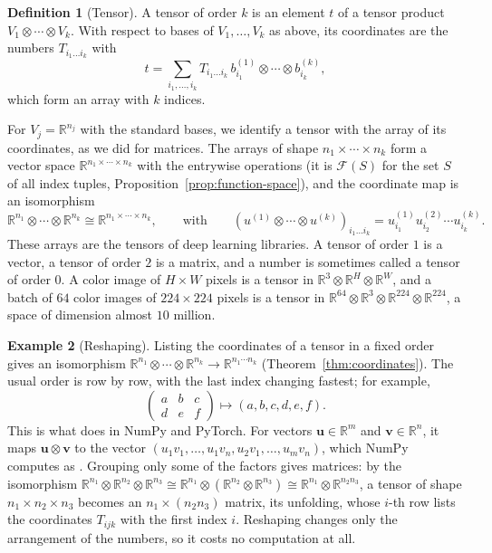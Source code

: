 \documentclass[11pt]{article}
\newcommand{\py}[1]{\texttt{\detokenize{#1}}}
\theoremstyle{definition}
\newtheorem{definition}{Definition}[section]
\newtheorem{example}[definition]{Example}
\theoremstyle{plain}
\theoremstyle{remark}
\begin{document}
\begin{definition}[Tensor]\label{def:tensor}
    A tensor of order $k$ is an element $t$ of a tensor product $V_1 \otimes \cdots \otimes V_k$. With respect to bases of $V_1, \ldots, V_k$ as above, its coordinates are the numbers $T_{i_1 \ldots i_k}$ with
    \[t = \sum_{i_1, \ldots, i_k} T_{i_1 \ldots i_k}\, b^{(1)}_{i_1} \otimes \cdots \otimes b^{(k)}_{i_k},\]
    which form an array with $k$ indices.
\end{definition}

For $V_j = \mathbb{R}^{n_j}$ with the standard bases, we identify a tensor with the array of its coordinates, as we did for matrices. The arrays of shape $n_1 \times \cdots \times n_k$ form a vector space $\mathbb{R}^{n_1 \times \cdots \times n_k}$ with the entrywise operations (it is $\mathcal{F}(S)$ for the set $S$ of all index tuples, Proposition~\ref{prop:function-space}), and the coordinate map is an isomorphism
\[\mathbb{R}^{n_1} \otimes \cdots \otimes \mathbb{R}^{n_k} \cong \mathbb{R}^{n_1 \times \cdots \times n_k}, \qquad \text{with} \qquad (u^{(1)} \otimes \cdots \otimes u^{(k)})_{i_1 \ldots i_k} = u^{(1)}_{i_1} u^{(2)}_{i_2} \cdots u^{(k)}_{i_k}.\]
These arrays are the tensors of deep learning libraries. A tensor of order $1$ is a vector, a tensor of order $2$ is a matrix, and a number is sometimes called a tensor of order $0$. A color image of $H \times W$ pixels is a tensor in $\mathbb{R}^3 \otimes \mathbb{R}^H \otimes \mathbb{R}^W$, and a batch of $64$ color images of $224 \times 224$ pixels is a tensor in $\mathbb{R}^{64} \otimes \mathbb{R}^3 \otimes \mathbb{R}^{224} \otimes \mathbb{R}^{224}$, a space of dimension almost $10$ million.

\begin{example}[Reshaping]\label{ex:reshape}
    Listing the coordinates of a tensor in a fixed order gives an isomorphism $\mathbb{R}^{n_1} \otimes \cdots \otimes \mathbb{R}^{n_k} \to \mathbb{R}^{n_1 \cdots n_k}$ (Theorem~\ref{thm:coordinates}). The usual order is row by row, with the last index changing fastest; for example,
    \[\begin{pmatrix} a & b & c \\ d & e & f \end{pmatrix} \mapsto (a, b, c, d, e, f).\]
    This is what \py{reshape} does in NumPy and PyTorch. For vectors $\mathbf{u} \in \mathbb{R}^m$ and $\mathbf{v} \in \mathbb{R}^n$, it maps $\mathbf{u} \otimes \mathbf{v}$ to the vector $(u_1v_1, \ldots, u_1v_n, u_2v_1, \ldots, u_mv_n)$, which NumPy computes as \py{np.kron(u, v)}. Grouping only some of the factors gives matrices: by the isomorphism $\mathbb{R}^{n_1} \otimes \mathbb{R}^{n_2} \otimes \mathbb{R}^{n_3} \cong \mathbb{R}^{n_1} \otimes (\mathbb{R}^{n_2} \otimes \mathbb{R}^{n_3}) \cong \mathbb{R}^{n_1} \otimes \mathbb{R}^{n_2n_3}$, a tensor of shape $n_1 \times n_2 \times n_3$ becomes an $n_1 \times (n_2n_3)$ matrix, its unfolding, whose $i$-th row lists the coordinates $T_{ijk}$ with the first index $i$. Reshaping changes only the arrangement of the numbers, so it costs no computation at all.
\end{example}
\end{document}
